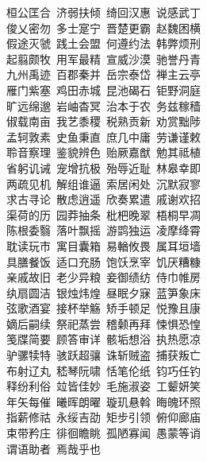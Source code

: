 桓公匡合~济弱扶倾~绮回汉惠~说感武丁\\
俊乂密勿~多士寔宁~晋楚更霸~赵魏困横\\
假途灭虢~践土会盟~何遵约法~韩弊烦刑\\
起翦颇牧~用军最精~宣威沙漠~驰誉丹青\\
九州禹迹~百郡秦并~岳宗泰岱~禅主云亭\\
雁门紫塞~鸡田赤城~昆池碣石~钜野洞庭\\
旷远绵邈~岩岫杳冥~治本于农~务兹稼穑\\
俶载南亩~我艺黍稷~税熟贡新~劝赏黜陟\\
孟轲敦素~史鱼秉直~庶几中庸~劳谦谨敕\\
聆音察理~鉴貌辨色~贻厥嘉猷~勉其祗植\\
省躬讥诫~宠增抗极~殆辱近耻~林皋幸即\\
两疏见机~解组谁逼~索居闲处~沉默寂寥\\
求古寻论~散虑逍遥~欣奏累遣~戚谢欢招\\
渠荷的历~园莽抽条~枇杷晚翠~梧桐早凋\\
陈根委翳~落叶飘摇~游鹍独运~凌摩绛霄\\
耽读玩市~寓目囊箱~易輶攸畏~属耳垣墙\\
具膳餐饭~适口充肠~饱饫烹宰~饥厌糟糠\\
亲戚故旧~老少异粮~妾御绩纺~侍巾帷房\\
纨扇圆洁~银烛炜煌~昼眠夕寐~蓝笋象床\\
弦歌酒宴~接杯举觞~矫手顿足~悦豫且康\\
嫡后嗣续~祭祀蒸尝~稽颡再拜~悚惧恐惶\\
笺牒简要~顾答审详~骸垢想浴~执热愿凉\\
驴骡犊特~骇跃超骧~诛斩贼盗~捕获叛亡\\
布射辽丸~嵇琴阮啸~恬笔伦纸~钧巧任钓\\
释纷利俗~竝皆佳妙~毛施淑姿~工颦妍笑\\
年矢每催~曦晖朗曜~璇玑悬斡~晦魄环照\\
指薪修祜~永绥吉劭~矩步引领~俯仰廊庙\\
束带矜庄~徘徊瞻眺~孤陋寡闻~愚蒙等诮\\
谓语助者~焉哉乎也\\
